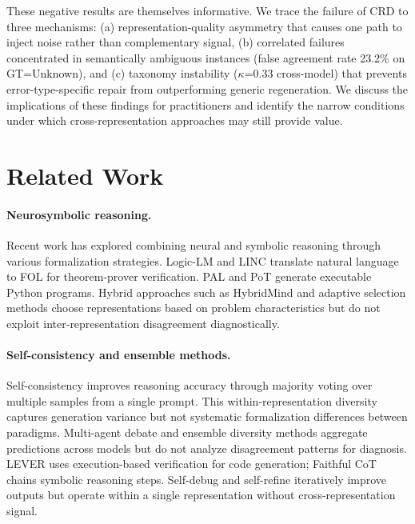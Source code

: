 \documentclass[11pt]{article}
\begin{document}
These negative results are themselves informative. We trace the failure of CRD to three mechanisms: (a) representation-quality asymmetry that causes one path to inject noise rather than complementary signal, (b) correlated failures concentrated in semantically ambiguous instances (false agreement rate 23.2\% on GT=Unknown), and (c) taxonomy instability ($\kappa$=0.33 cross-model) that prevents error-type-specific repair from outperforming generic regeneration. We discuss the implications of these findings for practitioners and identify the narrow conditions under which cross-representation approaches may still provide value.

\section{Related Work}

\paragraph{Neurosymbolic reasoning.} Recent work has explored combining neural and symbolic reasoning through various formalization strategies. Logic-LM \citep{pan2023logiclm} and LINC \citep{olausson2023linc} translate natural language to FOL for theorem-prover verification. PAL \citep{gao2023pal} and PoT \citep{chen2023pot} generate executable Python programs. Hybrid approaches such as HybridMind \citep{hybridmind2024} and adaptive selection methods choose representations based on problem characteristics but do not exploit inter-representation disagreement diagnostically.

\paragraph{Self-consistency and ensemble methods.} Self-consistency \citep{wang2023selfconsistency} improves reasoning accuracy through majority voting over multiple samples from a single prompt. This within-representation diversity captures generation variance but not systematic formalization differences between paradigms. Multi-agent debate \citep{liang2023multiagent} and ensemble diversity methods \citep{ensemble2024} aggregate predictions across models but do not analyze disagreement patterns for diagnosis. LEVER \citep{ni2023lever} uses execution-based verification for code generation; Faithful CoT \citep{lyu2023faithful} chains symbolic reasoning steps. Self-debug \citep{chen2024selfdebugging} and self-refine \citep{madaan2024selfrefine} iteratively improve outputs but operate within a single representation without cross-representation signal.
\end{document}
